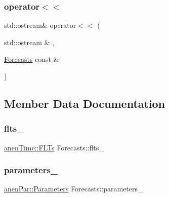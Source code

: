 \subsubsection{\texorpdfstring{operator$<$$<$}{operator<<}}
{\footnotesize\ttfamily std\+::ostream\& operator$<$$<$ (\begin{DoxyParamCaption}\item[{std\+::ostream \&}]{,  }\item[{\mbox{\hyperlink{class_forecasts}{Forecasts}} const \&}]{ }\end{DoxyParamCaption})\hspace{0.3cm}{\ttfamily [friend]}}



\subsection{Member Data Documentation}
\mbox{\label{class_forecasts_ace7fb459c34db19dfb77bc6861f9cdf5}} 
\subsubsection{\texorpdfstring{flts\+\_\+}{flts\_}}
{\footnotesize\ttfamily \mbox{\hyperlink{classanen_time_1_1_f_l_ts}{anen\+Time\+::\+F\+L\+Ts}} Forecasts\+::flts\+\_\+\hspace{0.3cm}{\ttfamily [protected]}}

\mbox{\label{class_forecasts_a514e1029a27c9d797212158238e4ec86}} 
\subsubsection{\texorpdfstring{parameters\+\_\+}{parameters\_}}
{\footnotesize\ttfamily \mbox{\hyperlink{classanen_par_1_1_parameters}{anen\+Par\+::\+Parameters}} Forecasts\+::parameters\+\_\+\hspace{0.3cm}{\ttfamily [protected]}}

\mbox{\label{class_forecasts_ac86fcc7d20b581d87a32eac26a5f8b01}} 
